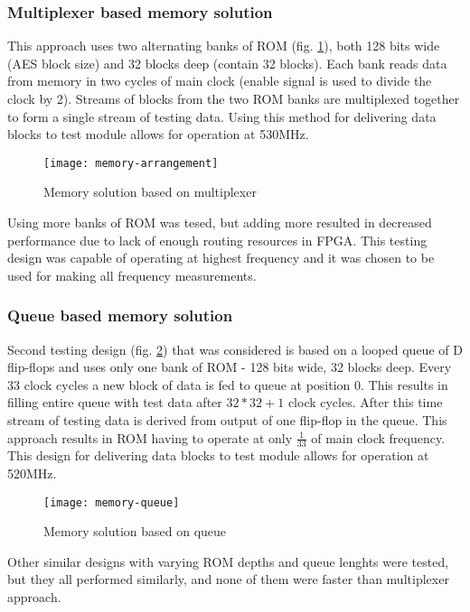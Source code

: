 \subsubsection{Multiplexer based memory solution}
This approach uses two alternating banks of ROM (fig. \ref{fig:memory-arrangement}), both 128 bits wide (AES block size) and 32 blocks deep (contain 32 blocks). Each bank reads data from memory in two cycles of main clock (enable signal is used to divide the clock by 2). Streams of blocks from the two ROM banks are multiplexed together to form a single stream of testing data. Using this method for delivering data blocks to test module allows for operation at 530MHz. 

\begin{figure}[!h]
\centering
\texttt{[image: memory-arrangement]}
\caption{Memory solution based on multiplexer}
\label{fig:memory-arrangement}
\end{figure}

Using more banks of ROM was tesed, but adding more resulted in decreased performance due to lack of enough routing resources in FPGA. This testing design was capable of operating at highest frequency and it was chosen to be used for making all frequency measurements.

\subsubsection{Queue based memory solution}
Second testing design (fig. \ref{fig:memory-queue}) that was considered is based on a looped queue of D flip-flops and uses only one bank of ROM - 128 bits wide, 32 blocks deep. Every 33 clock cycles a new block of data is fed to queue at position 0. This results in filling entire queue with test data after $32 * 32 + 1$ clock cycles. After this time stream of testing data is derived from output of one flip-flop in the queue. This approach results in ROM having to operate at only $\frac{1}{33}$ of main clock frequency. This design for delivering data blocks to test module allows for operation at 520MHz. 

\begin{figure}[!h]
\centering
\texttt{[image: memory-queue]}
\caption{Memory solution based on queue}
\label{fig:memory-queue}
\end{figure}

Other similar designs with varying ROM depths and queue lenghts were tested, but they all performed similarly, and none of them were faster than multiplexer approach.


